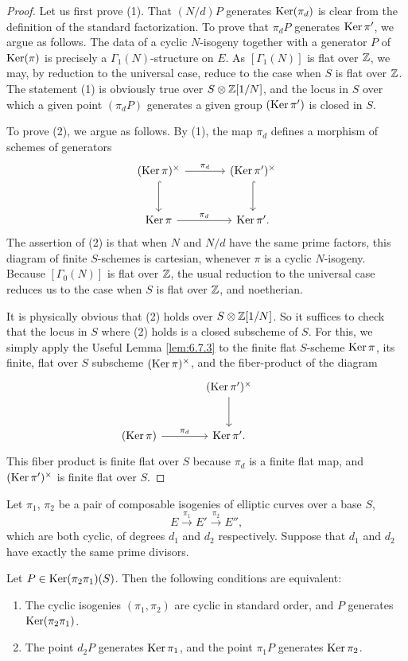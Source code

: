 \begin{proof}
Let us first prove (1). That $(N/d)P$ generates $\operatorname{Ker}(\pi_d)$ is clear from the definition of the standard factorization. To prove that $\pi_dP$ generates $\operatorname{Ker} \pi'$, we argue as follows. The data of a cyclic $N$-isogeny together with a generator $P$ of $\operatorname{Ker}(\pi)$ is precisely a $\Gamma_1(N)$-structure on $E$. As $[\Gamma_1(N)]$ is flat over $\mathbb{Z}$, we may, by reduction to the universal case, reduce to the case when $S$ is flat over $\mathbb{Z}$. The statement (1) is obviously true over $S \otimes \mathbb{Z}[1/N]$, and the locus in $S$ over which a given point $(\pi_dP)$ generates a given group $(\operatorname{Ker} \pi')$ is closed in $S$.

To prove (2), we argue as follows. By (1), the map $\pi_d$ defines a morphism of schemes of generators
\[
\begin{tikzcd}[row sep=large, column sep=large, every label/.append style={font=\scriptsize}]
(\Ker \pi)^\times \arrow[r, "\pi_d"] \arrow[d, hook] & (\Ker \pi')^\times \arrow[d, hook] \\
\Ker \pi \arrow[r, "\pi_d"] & \Ker \pi' .
\end{tikzcd}
\]
The assertion of (2) is that when $N$ and $N/d$ have the same prime factors, this diagram of finite $S$-schemes is cartesian, whenever $\pi$ is a cyclic $N$-isogeny. Because $[\Gamma_0(N)]$ is flat over $\mathbb{Z}$, the usual reduction to the universal case reduces us to the case when $S$ is flat over $\mathbb{Z}$, and noetherian.

It is physically obvious that (2) holds over $S \otimes \mathbb{Z}[1/N]$. So it suffices to check that the locus in $S$ where (2) holds is a closed subscheme of $S$. For this, we simply apply the Useful Lemma \ref{lem:6.7.3} to the finite flat $S$-scheme $\operatorname{Ker} \pi$, its finite, flat over $S$ subscheme $(\operatorname{Ker} \pi)^\times$, and the fiber-product of the diagram
\[
\begin{tikzcd}[row sep=large, column sep=large, every label/.append style={font=\scriptsize}]
& (\Ker \pi')^\times \arrow[d] & \\
(\Ker \pi) \arrow[r, "\pi_d"] & \Ker \pi' .
\end{tikzcd}
\]
This fiber product is finite flat over $S$ because $\pi_d$ is a finite flat map, and $(\operatorname{Ker} \pi')^\times$ is finite flat over $S$.
\end{proof}

\begin{kthm}\label{thm:6.7.12}
Let $\pi_1$, $\pi_2$ be a pair of composable isogenies of elliptic curves over a base $S$,
\[
E \xrightarrow{\pi_1} E' \xrightarrow{\pi_2} E'',
\]
which are both cyclic, of degrees $d_1$ and $d_2$ respectively. Suppose that $d_1$ and $d_2$ have exactly the same prime divisors.

Let $P \in \operatorname{Ker}(\pi_2\pi_1)(S)$. Then the following conditions are equivalent:
\begin{enumerate}[(1)]
\item The cyclic isogenies $(\pi_1,\pi_2)$ are cyclic in standard order, and $P$ generates $\operatorname{Ker}(\pi_2\pi_1)$.
\item The point $d_2P$ generates $\operatorname{Ker} \pi_1$, and the point $\pi_1P$ generates $\operatorname{Ker} \pi_2$.
\end{enumerate}
\end{kthm}

